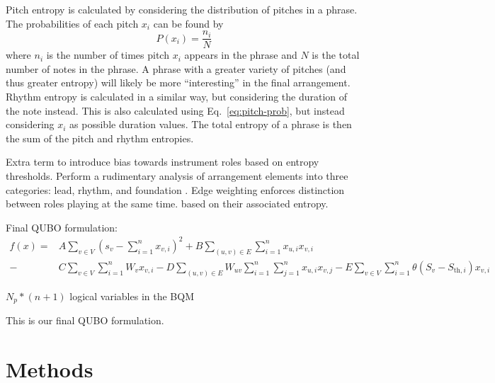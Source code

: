 \documentclass[12pt]{article}
\theoremstyle{definition}
\begin{document}
Pitch entropy is calculated by considering the distribution of pitches in a phrase. The probabilities of each pitch $x_i$ can be found by
\begin{equation}
    P(x_i)=\frac{n_i}{N}
    \label{eq:pitch-prob}
\end{equation}
where $n_i$ is the number of times pitch $x_i$ appears in the phrase and $N$ is the total number of notes in the phrase. A phrase with a greater variety of pitches (and thus greater entropy) will likely be more ``interesting'' in the final arrangement.
Rhythm entropy is calculated in a similar way, but considering the duration of the note instead. This is also calculated using Eq.\ \ref{eq:pitch-prob}, but instead considering $x_i$ as possible duration values.
The total entropy of a phrase is then the sum of the pitch and rhythm entropies.


Extra term to introduce bias towards instrument roles based on entropy thresholds. Perform a rudimentary analysis of arrangement elements into three categories: lead, rhythm, and foundation \cite{owsinski_mixing_2017}. Edge weighting enforces distinction between roles playing at the same time. based on their associated entropy.

Final QUBO formulation:
\begin{align}
    f(x)=&A\sum_{v \in V}\left(s_v-\sum_{i=1}^{n} x_{v,i}\right)^2+B\sum_{(u,v) \in E}\sum_{i=1}^n x_{u,i}x_{v,i}\\-&C\sum_{v \in V}\sum_{i=1}^n W_vx_{v,i}-D\sum_{(u,v)\in E}W_{uv}\sum_{i=1}^n\sum_{j=1}^n x_{u,i}x_{v,j}-E\sum_{v \in V}\sum_{i=1}^n\theta(S_v-S_{\text{th},i})x_{v,i}
    \label{eq:weightedMIS}
\end{align}

$N_p * (n+1)$ logical variables in the BQM

This is our final QUBO formulation.


\section{Methods}
\end{document}
